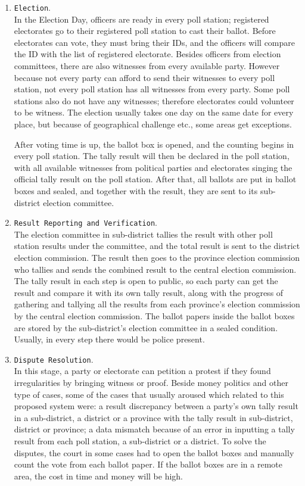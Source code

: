 \documentclass[JIP]{ipsj}
\def\|{\verb|}
\begin{document}
\begin{enumerate}
\item \|Election|.\\
In the Election Day, officers are ready in every poll station; registered electorates go to their registered poll station to cast their ballot. Before electorates can vote, they must bring their IDs, and the officers will compare the ID with the list of registered electorate. Besides officers from election committees, there are also witnesses from every available party. However because not every party can afford to send their witnesses to every poll station, not every poll station has all witnesses from every party. Some poll stations also do not have any witnesses; therefore electorates could volunteer to be witness. The election usually takes one day on the same date for every place, but because of geographical challenge etc., some areas get exceptions.

After voting time is up, the ballot box is opened, and the counting begins in every poll station. The tally result will then be declared in the poll station, with all available witnesses from political parties and electorates singing the official tally result on the poll station. After that, all ballots are put in ballot boxes and sealed, and together with the result, they are sent to its sub-district election committee.

\item \|Result Reporting and Verification|.\\
The election committee in sub-district tallies the result with other poll station results under the committee, and the total result is sent to the district election commission. The result then goes to the province election commission who tallies and sends the combined result to the central election commission. The tally result in each step is open to public, so each party can get the result and compare it with its own tally result, along with the progress of gathering and tallying all the results from each province's election commission by the central election commission. The ballot papers inside the ballot boxes are stored by the sub-district's election committee in a sealed condition. Usually, in every step there would be police present.

\item \|Dispute Resolution|.\\
In this stage, a party or electorate can petition a protest if they found irregularities by bringing witness or proof. Beside money politics and other type of cases, some of the cases that usually aroused which related to this proposed system were: a result discrepancy between a party's own tally result in a sub-district, a district or a province with the tally result in sub-district, district or province; a data mismatch because of an error in inputting a tally result from each poll station, a sub-district or a district. To solve the disputes, the court in some cases had to open the ballot boxes and manually count the vote from each ballot paper. If the ballot boxes are in a remote area, the cost in time and money will be high.


\end{enumerate}
\end{document}
